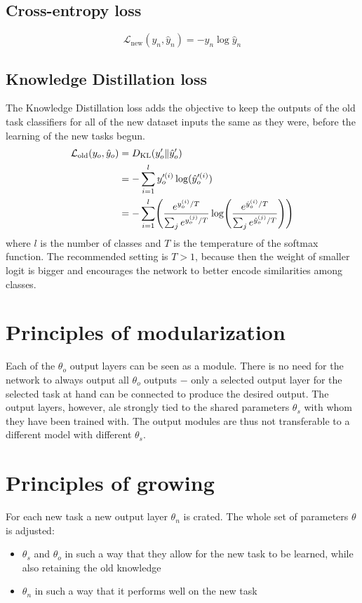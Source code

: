 \documentclass[a4paper,twocolumn]{article}
\let\originalleft\left
\let\originalright\right
\renewcommand{\left}{\mathopen{}\mathclose\bgroup\originalleft}
\renewcommand{\right}{\aftergroup\egroup\originalright}
\begin{document}
\subsection{Cross-entropy loss}
\label{ssec:CEloss}
\begin{equation*}
    \mathcal{L}_{\mathrm{new}}(y_n, \hat{y}_n) = -y_n \log\hat{y}_n
\end{equation*}

\subsection{Knowledge Distillation loss}
\label{ssec:KDloss}
The Knowledge Distillation loss adds the objective to keep the outputs of the old task classifiers for all of the new dataset inputs the same as they were, before the learning of the new tasks begun.
\begin{align*}
    \mathcal{L}_{\mathrm{old}}(y_o, \hat{y}_o) &= D_{\mathrm{KL}}(y_o^\prime\|\hat{y}_o^\prime) \\
                &= - \sum_{i=1}^l y_o^{\prime(i)} \log(\hat{y}_o^{\prime(i)}) \\
                &= - \sum_{i=1}^l \left( \frac{e^{y_o^{(i)}/T}}{\sum_j e^{y_o^{(j)}/T}} \log \left( \frac{e^{\hat{y}_o^{(i)}/T}}{\sum_j e^{\hat{y}_o^{(j)}/T}} \right) \right)
\end{align*}
where $l$ is the number of classes and $T$ is the temperature of the softmax function. The recommended setting is $T > 1$, because then the weight of smaller logit is bigger and encourages the network to better encode similarities among classes. %

\section{Principles of modularization}
Each of the $\theta_o$ output layers can be seen as a module. There is no need for the network to always output all $\theta_o$ outputs $-$ only a selected output layer for the selected task at hand can be connected to produce the desired output. The output layers, however, ale strongly tied to the shared parameters $\theta_s$ with whom they have been trained with. The output modules are thus not transferable to a different model with different $\theta_s$.

\section{Principles of growing}
For each new task a new output layer $\theta_n$ is crated. The whole set of parameters $\theta$ is adjusted:
\begin{itemize}
    \item $\theta_s$ and $\theta_o$ in such a way that they allow for the new task to be learned, while also retaining the old knowledge
    \item $\theta_n$ in such a way that it performs well on the new task
\end{itemize}
\end{document}
